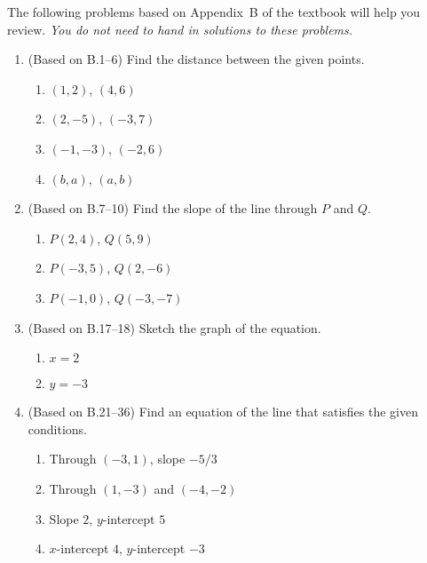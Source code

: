 \documentclass[11pt]{article}
\title{\commonPSTitleZeroZeroB}
\author{\commonAuthor}
\date{\commonDateZeroZeroB}
\newcommand{\ds}{\displaystyle}
\begin{document}
\maketitle
\thispagestyle{empty}

\noindent
The following problems based on Appendix~B of the textbook will help
you review.  \emph{You do not need to hand in solutions to these
  problems.}
\begin{enumerate}
\item (Based on B.1--6) Find the distance between the given points.
  \begin{multicols}{4}
  \begin{enumerate}
  \item $\ds (1,2)$, $\ds (4,6)$
  \item $\ds (2,-5)$, $\ds (-3,7)$
  \item $\ds (-1,-3)$, $\ds (-2,6)$
  \item $\ds (b,a)$, $\ds (a,b)$
  \end{enumerate}
  \end{multicols}
\item (Based on B.7--10) Find the slope of the line through $P$ and $Q$.
  \begin{multicols}{3}
  \begin{enumerate}
  \item $\ds P(2,4)$, $\ds Q(5,9)$
  \item $\ds P(-3,5)$, $\ds Q(2,-6)$
  \item $\ds P(-1,0)$, $\ds Q(-3,-7)$
  \end{enumerate}
  \end{multicols}
\item (Based on B.17--18) Sketch the graph of the equation.
  \begin{multicols}{2}
  \begin{enumerate}
  \item $\ds x=2$
  \item $\ds y=-3$
  \end{enumerate}
  \end{multicols}
\item (Based on B.21--36) Find an equation of the line that satisfies the
  given conditions.
  \begin{enumerate}
  \item Through $(-3,1)$, slope $-5/3$
  \item Through $(1,-3)$ and $(-4,-2)$
  \item Slope $2$, $y$-intercept $5$
  \item $x$-intercept $4$, $y$-intercept $-3$

\end{enumerate}
\end{enumerate}
\end{document}
